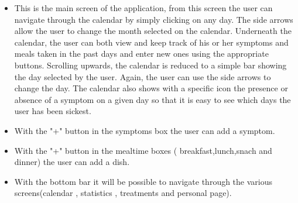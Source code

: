 \documentclass [12pt]{article}
\begin{document}
\begin{description}[leftmargin=1cm,rightmargin=1cm]
\begin{itemize}[•]
\item This is the main screen of the application, from this screen the user can navigate through the calendar by simply clicking on any day. The side arrows allow the user to change the month selected on the calendar.  Underneath the calendar, the user can both view and keep track of his or her symptoms and meals taken in the past days and enter new ones using the appropriate buttons.  Scrolling upwards, the calendar is reduced to a simple bar showing the day selected by the user. Again, the user can use the side arrows to change the day. The calendar also shows with a specific icon the presence or absence of a symptom on a given day so that it is easy to see which days the user has been sickest.
\item With the "+" button in the symptoms box the user can add a symptom.
\item With the "+" button in the mealtime boxes ( breakfast,lunch,snach and dinner) the user can add a dish.
\item With the bottom bar  it will be possible to navigate through the various screens(calendar , statistics , treatments and personal page).
\end{itemize}
\item [ 2)Add symptom page]
\
\
\
\begin{figure}[h!]
\centering
\hspace*{\fill}
\begin{subfigure}[tl]{0.3\linewidth}

\end{subfigure}
\end{figure}
\end{description}
\end{document}

